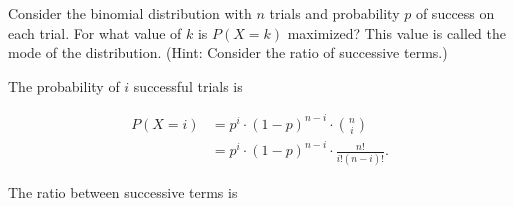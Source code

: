 \documentclass[answers]{exam}
\begin{document}
\begin{questions}

\question[10]
Consider the binomial distribution with \(n\) trials and probability \(p\) of
success on each trial. For what value of \(k\) is \(P(X=k)\) maximized? This
value is called the mode of the distribution. (Hint: Consider the ratio of
successive terms.)

\begin{solution}
The probability of $i$ successful trials is

\begin{align*}
P(X=i) &= p^{i} \cdot (1-p)^{n-i} \cdot \binom{n}{i} \\ 
&= p^{i} \cdot (1-p)^{n-i} \cdot \frac{n!}{i!(n-i)!}
.\end{align*}

The ratio between successive terms is 


\end{solution}
\end{questions}
\end{document}
